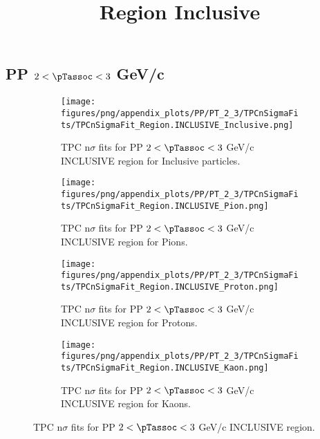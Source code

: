     
            \subsection*{PP $2 < \pTassoc < 3$ GeV/c}
            \begin{figure}[H]
                \title{Region Inclusive}
                \begin{subfigure}[b]{0.5\textwidth}
                    \centering
                    \texttt{[image: figures/png/appendix\_plots/PP/PT\_2\_3/TPCnSigmaFits/TPCnSigmaFit\_Region.INCLUSIVE\_Inclusive.png]}
                    \caption{TPC n$\sigma$ fits for PP $2 < \pTassoc < 3$ GeV/c INCLUSIVE region for Inclusive particles.}
                    \label{fig:appendix_PP_$2 < \pTassoc < 3$ GeV/c_INCLUSIVE_Inclusive}
                \end{subfigure}
                \begin{subfigure}[b]{0.5\textwidth}
                    \centering
                    \texttt{[image: figures/png/appendix\_plots/PP/PT\_2\_3/TPCnSigmaFits/TPCnSigmaFit\_Region.INCLUSIVE\_Pion.png]}
                    \caption{TPC n$\sigma$ fits for PP $2 < \pTassoc < 3$ GeV/c INCLUSIVE region for Pions.}
                    \label{fig:appendix_PP_$2 < \pTassoc < 3$ GeV/c_INCLUSIVE_Pion}
                \end{subfigure}
                \begin{subfigure}[b]{0.5\textwidth}
                    \centering
                    \texttt{[image: figures/png/appendix\_plots/PP/PT\_2\_3/TPCnSigmaFits/TPCnSigmaFit\_Region.INCLUSIVE\_Proton.png]}
                    \caption{TPC n$\sigma$ fits for PP $2 < \pTassoc < 3$ GeV/c INCLUSIVE region for Protons.}
                    \label{fig:appendix_PP_$2 < \pTassoc < 3$ GeV/c_INCLUSIVE_Proton}
                \end{subfigure}
                \begin{subfigure}[b]{0.5\textwidth}
                    \centering
                    \texttt{[image: figures/png/appendix\_plots/PP/PT\_2\_3/TPCnSigmaFits/TPCnSigmaFit\_Region.INCLUSIVE\_Kaon.png]}
                    \caption{TPC n$\sigma$ fits for PP $2 < \pTassoc < 3$ GeV/c INCLUSIVE region for Kaons.}
                    \label{fig:appendix_PP_$2 < \pTassoc < 3$ GeV/c_INCLUSIVE_Kaon}
                \end{subfigure}
                \caption{TPC n$\sigma$ fits for PP $2 < \pTassoc < 3$ GeV/c INCLUSIVE region.}
                \label{fig:appendix_PP_$2 < \pTassoc < 3$ GeV/c_INCLUSIVE}
            \end{figure}
